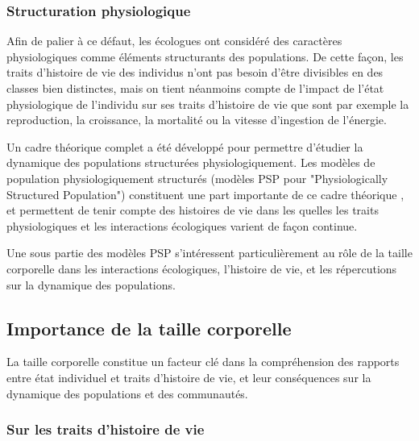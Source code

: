 \subsubsection{Structuration physiologique}

Afin de palier à ce défaut, les écologues ont considéré des caractères
physiologiques comme éléments structurants des populations. De cette façon, les
traits d'histoire de vie des individus n'ont pas besoin d'être divisibles en des
classes bien distinctes, mais on tient néanmoins compte de l'impact de l'état
physiologique de l'individu sur ses traits d'histoire de vie que sont par
exemple la reproduction, la croissance, la mortalité ou la vitesse d'ingestion
de l'énergie. 

Un cadre théorique complet a été développé pour permettre d'étudier la dynamique
des populations structurées physiologiquement. Les modèles de
population physiologiquement structurés (modèles PSP pour "Physiologically
Structured Population") constituent une part importante de ce cadre théorique
\autocite{metz1986a,de-roos1992a,de-roos1997a}, et permettent de tenir compte
des histoires de vie dans les quelles les traits physiologiques et les
interactions écologiques varient de façon continue. 

Une sous partie des modèles PSP s'intéressent particulièrement au rôle de la
taille corporelle dans les interactions écologiques, l'histoire de vie, et les
répercutions sur la dynamique des populations. 

\subsection{Importance de la taille corporelle}

La taille corporelle constitue un facteur clé dans la compréhension des rapports
entre état individuel et traits d'histoire de vie, et leur conséquences sur la
dynamique des populations et des communautés. 

\subsubsection{Sur les traits d'histoire de vie}

